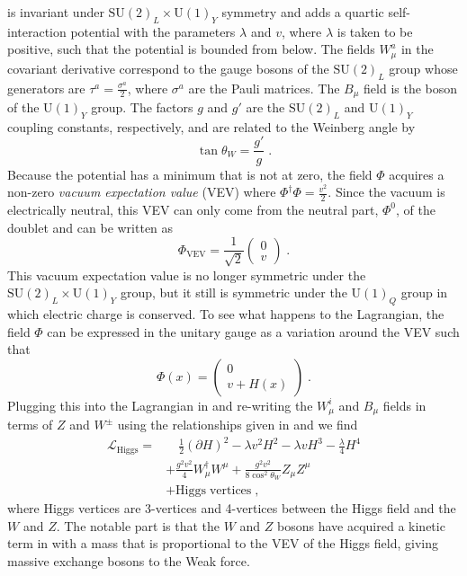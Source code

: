is invariant under $\mathrm{SU}(2)_L \times \mathrm{U}(1)_Y$ symmetry and adds a quartic self-interaction potential with the parameters $\lambda$ and $v$, where $\lambda$ is taken to be positive, such that the potential is bounded from below. The fields $W_\mu^a$ in the covariant derivative correspond to the gauge bosons of the $\mathrm{SU}(2)_L$ group whose generators are $\tau^a = \frac{\sigma^a}{2}$, where $\sigma^a$ are the Pauli matrices. The $B_\mu$ field is the boson of the $\mathrm{U}(1)_Y$ group. The factors $g$ and $g'$ are the $\mathrm{SU}(2)_L$ and $\mathrm{U}(1)_Y$ coupling constants, respectively, and are related to the Weinberg angle by
\begin{equation}
    \tan \theta_W = \frac{g'}{g}\;.\label{eq:weinberg-angle}
\end{equation}
Because the potential has a minimum that is not at zero, the field $\Phi$ acquires a non-zero \emph{vacuum expectation value} (VEV) where $\Phi^\dag \Phi = \frac{v^2}{2}$. Since the vacuum is electrically neutral, this VEV can only come from the neutral part, $\Phi^0$, of the doublet and can be written as
\begin{equation}
    \Phi_\mathrm{VEV} = \frac{1}{\sqrt{2}}\begin{pmatrix}
        0\\
        v
    \end{pmatrix}\;.
\end{equation}
This vacuum expectation value is no longer symmetric under the $\mathrm{SU}(2)_L \times \mathrm{U}(1)_Y$ group, but it still is symmetric under the $\mathrm{U}(1)_Q$ group in which electric charge is conserved. To see what happens to the Lagrangian, the field $\Phi$ can be expressed in the unitary gauge as a variation around the VEV such that
\begin{equation}
    \Phi(x) = \begin{pmatrix}
        0 \\
        v + H(x)
    \end{pmatrix}\;.
\end{equation}
Plugging this into the Lagrangian in  and re-writing the $W_\mu^i$ and $B_\mu$ fields in terms of $Z$ and $W^\pm$ using the relationships given in  and  we find
\begin{align}
    \mathcal{L}_\mathrm{Higgs} = &\hspace{1em}\frac{1}{2}(\partial H)^2 - \lambda v^2 H^2 - \lambda v H^3 - \frac{\lambda}{4}H^4 \\
    &+ \frac{g^2v^2}{4} W_\mu^\dag W^\mu + \frac{g^2 v^2}{8\cos^2\theta_W}Z_\mu Z^\mu \label{eq:boson-mass-terms}\\
    &+ \mathrm{Higgs\;vertices}\;,
\end{align}
where Higgs vertices are 3-vertices and 4-vertices between the Higgs field and the $W$ and $Z$. The notable part is that the $W$ and $Z$ bosons have acquired a kinetic term in  with a mass that is proportional to the VEV of the Higgs field, giving massive exchange bosons to the Weak force.

